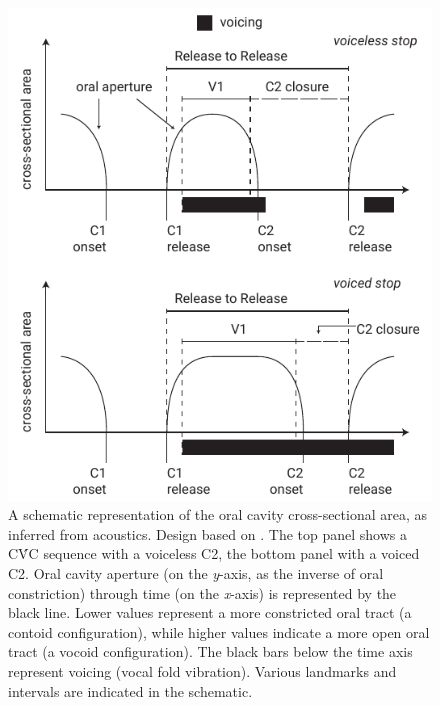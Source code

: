 \documentclass[12pt,]{article}
\begin{document}
\begin{figure}
  \centering
  \includegraphics{img/Figure6.pdf}
  \caption{A schematic representation of the oral cavity cross-sectional area, as inferred from acoustics. Design based on \citet{esposito2002}. The top panel shows a CV́C sequence with a voiceless C2, the bottom panel with a voiced C2. Oral cavity aperture (on the \textit{y}-axis, as the inverse of oral constriction) through time (on the \textit{x}-axis) is represented by the black line. Lower values represent a more constricted oral tract (a contoid configuration), while higher values indicate a more open oral tract (a vocoid configuration). The black bars below the time axis represent voicing (vocal fold vibration). Various landmarks and intervals are indicated in the schematic.}
  \label{f:compensatory}
\end{figure}
\end{document}

